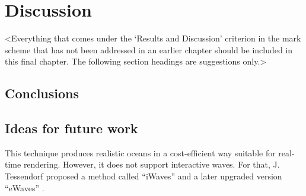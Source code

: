 \chapter{Discussion}
\label{chapter4}

<Everything that comes under the `Results and Discussion' criterion in the mark scheme that has not been addressed in an earlier chapter should be included in this final chapter. The following section headings are suggestions only.>

\section{Conclusions}
\lipsum[13]

\section{Ideas for future work}
This technique produces realistic oceans in a cost-efficient way suitable for real-time rendering. However, it does not support interactive waves. For that, J. Tessendorf proposed a method called “iWaves” \cite{tessendorf2004} and a later upgraded version “eWaves” \cite{tessendorf2014}.

